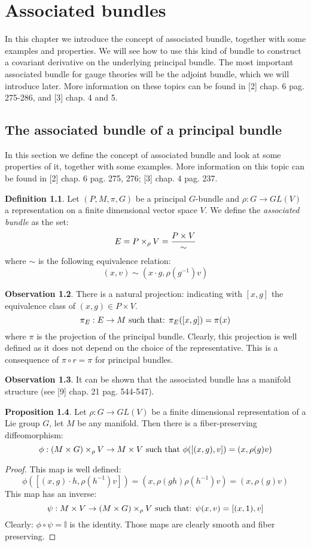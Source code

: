 \documentclass[12pt,a4paper]{report}
\theoremstyle{definition}
\newtheorem{Def}{Definition}[chapter]
\theoremstyle{Theorem}
\newtheorem{Prop}[Def]{Proposition}
\theoremstyle{definition}
\theoremstyle{definition}
\newtheorem{Obs}[Def]{Observation}
\begin{document}
	\chapter{Associated bundles}
	In this chapter we introduce the concept of associated bundle, together with some examples and properties. We will see how to use this kind of bundle to construct a covariant derivative on the underlying principal bundle. The most important associated bundle for gauge theories will be the adjoint bundle, which we will introduce later. More information on these topics can be found in [2] chap. 6 pag. 275-286, and [3] chap. 4 and 5.
	\section{The associated bundle of a principal bundle}
	In this section we define the concept of associated bundle and look at some properties of it, together with some examples. More information on this topic can be found in [2] chap. 6 pag. 275, 276; [3] chap. 4 pag. 237.
	\begin{Def}
		Let $(P,M,\pi,G)$ be a principal $G$-bundle and $\rho:G\rightarrow GL(V)$ a representation on a finite dimensional vector space $V$. We define the \textit{associated bundle} as the set: 
		$$E=P\times_\rho V={P\times V\over \sim}$$
		where $\sim$ is the following equivalence relation:
		$$(x,v)\sim(x\cdot g,\rho(g^{-1})v)$$ 
	\end{Def}
	\begin{Obs}
		There is a natural projection: indicating with $[x,g]$ the equivalence class of $(x,g)\in P\times V$.
		$$\pi_E:E\rightarrow M\hbox{ such that: }\pi_E([x,g])=\pi(x)$$
		where $\pi$ is the projection of the principal bundle. Clearly, this projection is well defined as it does not depend on the choice of the representative. This is a consequence of $\pi\circ r=\pi$ for principal bundles.
	\end{Obs}
	\begin{Obs}
		It can be shown that the associated bundle has a manifold structure (see [9] chap. 21 pag. 544-547).
	\end{Obs}
	\begin{Prop}\label{Prop_6.1.1}
		Let $\rho:G\rightarrow GL(V)$ be a finite dimensional representation of a Lie group $G$, let $M$ be any manifold. Then there is a fiber-preserving diffeomorphism:
		$$\phi:(M\times G)\times_\rho V\rightarrow M\times V\hbox{ such that }\phi([(x,g),v])=(x,\rho(g)v)$$
	\end{Prop}
	\begin{proof}
		This map is well defined:
		$$\phi([(x,g)\cdot h,\rho(h^{-1})v])=(x,\rho(gh)\rho(h^{-1})v)=(x,\rho(g)v)$$
		This map has an inverse:
		$$\psi:M\times V\rightarrow (M\times G)\times_\rho V\hbox{ such that: }
		\psi(x,v)=[(x,1),v]$$
		Clearly: $\phi\circ \psi=\mathbb{I}$ is the identity. Those maps are clearly smooth and fiber preserving.
	\end{proof}
\end{document}
